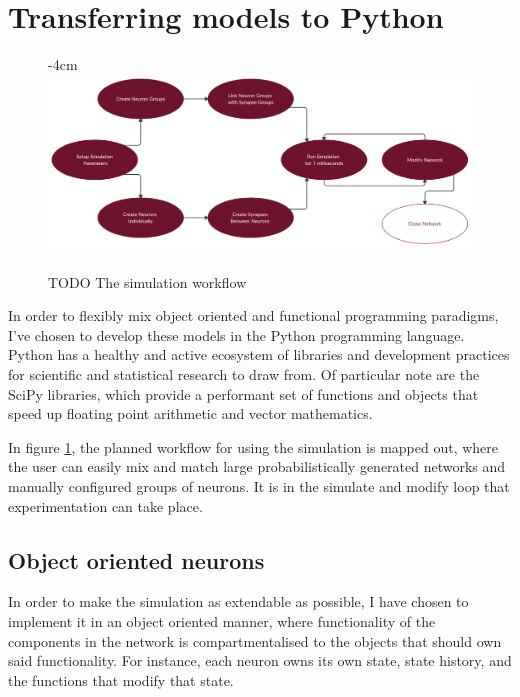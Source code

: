 
\section{Transferring models to Python}

\begin{figure}[h]
    \centering
    \addtolength{\leftskip} {-4cm}
    \addtolength{\rightskip}{-4cm}
    \includegraphics[width=1.3\linewidth]{figures/images/workflow.png}
    \caption{TODO The simulation workflow}
    \label{fig:workflow}
\end{figure}

In order to flexibly mix object oriented and functional programming paradigms,
I've chosen to develop these models in the Python programming language. Python has a healthy and active ecosystem of libraries and development practices
for scientific and statistical research to draw from. Of particular note are the
SciPy libraries, which provide a performant set of functions and objects that
speed up floating point arithmetic and vector mathematics. 

In figure \ref{fig:workflow}, the planned workflow for using the simulation is
mapped out, where the user can easily mix and match large probabilistically
generated networks and manually configured groups of neurons. It is in the
simulate and modify loop that experimentation can take place.

\subsection{Object oriented neurons}

In order to make the simulation as extendable as possible, I have chosen to
implement it in an object oriented manner, where functionality of the components
in the network is compartmentalised to the objects that should own said
functionality. For instance, each neuron owns its own state, state history, and
the functions that modify that state.

